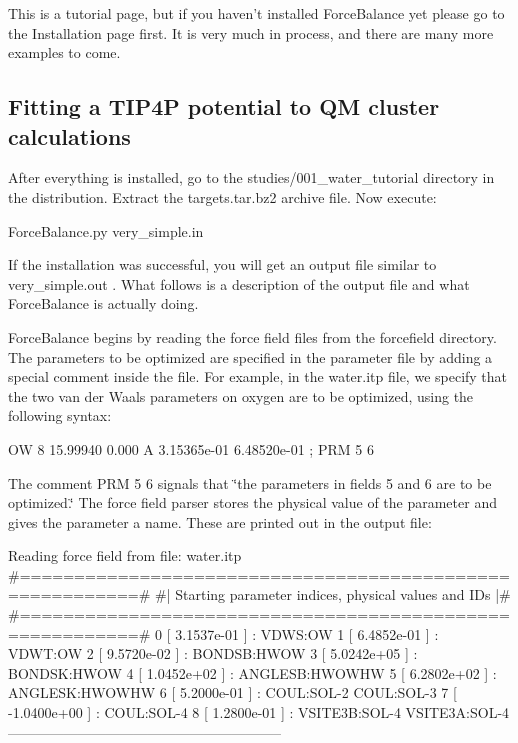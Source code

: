 This is a tutorial page, but if you haven't installed Force\-Balance yet please go to the Installation page first. It is very much in process, and there are many more examples to come.\hypertarget{tutorial_tip4p}{}\subsection{Fitting a T\-I\-P4\-P potential to Q\-M cluster calculations}\label{tutorial_tip4p}
After everything is installed, go to the {\ttfamily studies/001\-\_\-water\-\_\-tutorial} directory in the distribution. Extract the {\ttfamily targets.\-tar.\-bz2} archive file. Now execute\-:

\begin{DoxyVerb}ForceBalance.py very_simple.in
\end{DoxyVerb}


If the installation was successful, you will get an output file similar to {\ttfamily very\-\_\-simple.\-out} . What follows is a description of the output file and what Force\-Balance is actually doing.

Force\-Balance begins by reading the force field files from the {\ttfamily forcefield} directory. The parameters to be optimized are specified in the parameter file by adding a special comment inside the file. For example, in the {\ttfamily water.\-itp} file, we specify that the two van der Waals parameters on oxygen are to be optimized, using the following syntax\-:

\begin{DoxyVerb}OW      8     15.99940     0.000       A    3.15365e-01  6.48520e-01 ; PRM 5 6
\end{DoxyVerb}


The comment {\ttfamily P\-R\-M 5 6} signals that \char`\"{}the parameters in fields 5
and 6 are to be optimized.\char`\"{} The force field parser stores the physical value of the parameter and gives the parameter a name. These are printed out in the output file\-:

\begin{DoxyVerb}Reading force field from file: water.itp
#=========================================================#
#|  Starting parameter indices, physical values and IDs  |#
#=========================================================#
   0 [  3.1537e-01 ] : VDWS:OW
   1 [  6.4852e-01 ] : VDWT:OW
   2 [  9.5720e-02 ] : BONDSB:HWOW
   3 [  5.0242e+05 ] : BONDSK:HWOW
   4 [  1.0452e+02 ] : ANGLESB:HWOWHW
   5 [  6.2802e+02 ] : ANGLESK:HWOWHW
   6 [  5.2000e-01 ] : COUL:SOL-2 COUL:SOL-3
   7 [ -1.0400e+00 ] : COUL:SOL-4
   8 [  1.2800e-01 ] : VSITE3B:SOL-4 VSITE3A:SOL-4
-----------------------------------------------------------
\end{DoxyVerb}


